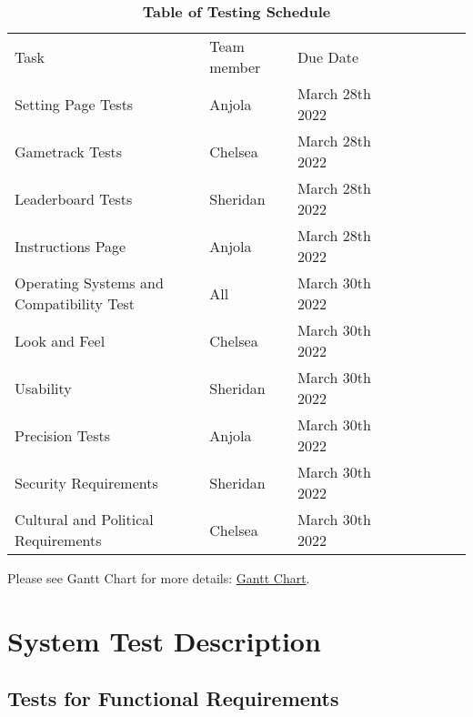 \documentclass[12pt, titlepage]{article}
\begin{document}
\begin{table}[H]
\caption{\textbf{Table of Testing Schedule}} \label{Table}
\begin{tabular}{|l|l|l|llllll}
\cline{1-3}
Task                                     & Team member & Due Date        &  &  &  &  &  &  \\ \cline{1-3}
Setting Page Tests                       & Anjola      & March 28th 2022 &  &  &  &  &  &  \\ \cline{1-3}
Gametrack Tests                          & Chelsea     & March 28th 2022 &  &  &  &  &  &  \\ \cline{1-3}
Leaderboard Tests                        & Sheridan    & March 28th 2022 &  &  &  &  &  &  \\ \cline{1-3}
Instructions Page                        & Anjola      & March 28th 2022 &  &  &  &  &  &  \\ \cline{1-3}
Operating Systems and Compatibility Test & All         & March 30th 2022 &  &  &  &  &  &  \\ \cline{1-3}
Look and Feel                            & Chelsea     & March 30th 2022 &  &  &  &  &  &  \\ \cline{1-3}
Usability                                & Sheridan    & March 30th 2022 &  &  &  &  &  &  \\ \cline{1-3}
Precision Tests                          & Anjola      & March 30th 2022 &  &  &  &  &  &  \\ \cline{1-3}
Security Requirements                    & Sheridan    & March 30th 2022 &  &  &  &  &  &  \\ \cline{1-3}
Cultural and Political Requirements      & Chelsea     & March 30th 2022 &  &  &  &  &  &  \\ \cline{1-3}
\end{tabular}
\end{table}

Please see Gantt Chart for more details:
\href{https://gitlab.cas.mcmaster.ca/maramotc/se3xa3/-/blob/main/ProjectSchedule/TestingGanttChart.pdf}{\color{blue}Gantt Chart}.


\section{System Test Description}

	
\subsection{Tests for Functional Requirements}
\end{document}
